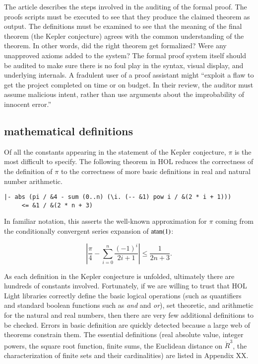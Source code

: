 The article \cite{XX-Adams} describes the steps involved in the
auditing of the formal proof.  The proofs scripts must be executed to
see that they produce the claimed theorem as output.  The definitions
must be examined to see that the meaning of the final theorem (the
Kepler conjecture) agrees with the common understanding of the
theorem.  In other words, did the right theorem get formalized?  Were
any unapproved axioms added to the system?  The formal proof system
itself should be audited to make sure there is no foul play in the
syntax, visual display, and underlying internals.  A fradulent user of
a proof assistant might ``exploit a flaw to get the project completed
on time or on budget.  In their review, the auditor must assume
malicious intent, rather than use arguments about the improbability of
innocent error.''

\subsection{mathematical definitions}

Of all the constants appearing in the statement of the Kepler
conjecture, $\pi$ is the most difficult to specify.  The following
theorem in HOL reduces the correctness of the definition of $\pi$
to the correctness of more basic definitions in real and natural
number arithmetic.

\begin{obeylines}

\begin{verbatim}
|- abs (pi / &4 - sum (0..n) (\i. (-- &1) pow i / &(2 * i + 1))) 
     <= &1 / &(2 * n + 3)
\end{verbatim}

\end{obeylines}

In familiar notation, this asserts the well-known approximation for
$\pi$ coming from the conditionally convergent series expansion of
${\operatorname{atan}}(1)$:

\[
   \left| \frac{\pi}{4} - \sum_{i=0}^n \frac { (-1)^i } { 2 i + 1} \right | \le \frac {1} {2 n + 3}.
\]

As each definition in the Kepler conjecture is unfolded, ultimately
there are hundreds of constants involved.  Fortunately, if we are
willing to trust that HOL Light libraries correctly define the basic
logical operations (such as quantifiers and standard boolean functions
such as {\it and} and {\it or}), set theoretic, and arithmetic for the
natural and real numbers, then there are very few additional
definitions to be checked.  Errors in basic definition are quickly
detected because a large web of theorems constrain them.  The
essential definitions (real absolute value, integer powers, the square
root function, finite sums, the Euclidean distance on $\ring{R}^3$,
the characterization of finite sets and their cardinalities) are
listed in Appendix XX.


